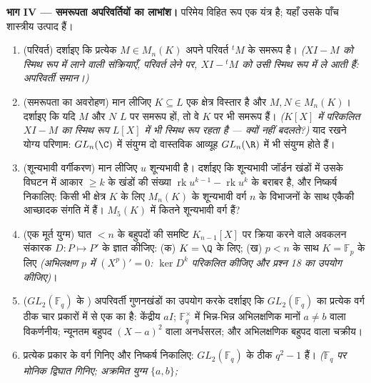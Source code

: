 \begin{problem}
\medskip
\noindent\textbf{भाग IV --- समरूपता अपरिवर्तियों का लाभांश।}
परिमेय विहित रूप एक यंत्र है; यहाँ उसके पाँच शास्त्रीय उत्पाद
हैं।
\begin{enumerate}[resume]
  \item (परिवर्त) दर्शाइए कि प्रत्येक $M \in M_n(K)$ अपने परिवर्त ${}^tM$
        के समरूप है। \emph{($XI - M$ को स्मिथ रूप में लाने वाली
        संक्रियाएँ, परिवर्त लेने पर, $XI - {}^tM$ को उसी स्मिथ रूप में
        ले आती हैं: अपरिवर्ती समान।)}
  \item (समरूपता का अवरोहण) मान लीजिए $K \subseteq L$ एक क्षेत्र विस्तार
        है और $M, N \in M_n(K)$। दर्शाइए कि यदि $M$ और $N$ $L$ पर
        समरूप हों, तो वे $K$ पर भी समरूप हैं। \emph{($K[X]$ में
        परिकलित $XI - M$ का स्मिथ रूप $L[X]$ में भी स्मिथ रूप रहता है
        ---  क्यों नहीं बदलते?)} याद रखने योग्य
        परिणाम: $GL_n(\C)$ में संयुग्म दो वास्तविक आव्यूह $GL_n(\R)$ में
        भी संयुग्म होते हैं।
  \item (शून्यभावी वर्गीकरण) मान लीजिए $u$ शून्यभावी है।
        दर्शाइए कि शून्यभावी जॉर्डन खंडों में उसके विघटन में
        आकार $\geq k$ के खंडों की संख्या $\operatorname{rk}u^{k-1} - \operatorname{rk}u^k$ के बराबर है, और
        निष्कर्ष निकालिए: किसी भी क्षेत्र $K$ के लिए $M_n(K)$ के
        शून्यभावी वर्ग $n$ के विभाजनों के साथ एकैकी आच्छादक
        संगति में हैं। $M_5(K)$ में कितने शून्यभावी वर्ग हैं?
  \item (एक मूर्त युग्म) घात $< n$ के बहुपदों की समष्टि $K_{n-1}[X]$ पर
        क्रिया करने वाले अवकलन संकारक $D\colon P \mapsto P'$ के 
        ज्ञात कीजिए: (क) $K =
        \Q$ के लिए; (ख) $p < n$ के साथ $K = \mathbb F_p$ के
        लिए \emph{(अभिलक्षण $p$ में $(X^p)' = 0$: $\ker D^k$ परिकलित कीजिए
        और प्रश्न 18 का उपयोग कीजिए)}।
  \item ($GL_2(\mathbb F_q)$ के ) अपरिवर्ती गुणनखंडों का उपयोग
        करके दर्शाइए कि $GL_2(\mathbb F_q)$ का प्रत्येक वर्ग ठीक चार प्रकारों
        में से एक का है: केंद्रीय $aI$; $\mathbb F_q^\times$ में भिन्न-भिन्न
        अभिलक्षणिक मानों $a \neq b$ वाला विकर्णनीय; न्यूनतम बहुपद
        $(X - a)^2$ वाला अनर्धसरल; और  अभिलक्षणिक बहुपद वाला
        चक्रीय।
  \item प्रत्येक प्रकार के वर्ग गिनिए और निष्कर्ष निकालिए:
        $GL_2(\mathbb F_q)$ के ठीक $q^2 - 1$  हैं। \emph{($\mathbb F_q$ पर
        मोनिक  द्विघात गिनिए; अक्रमित युग्म $\{a, b\}$;
}
\end{enumerate}
\end{problem}
